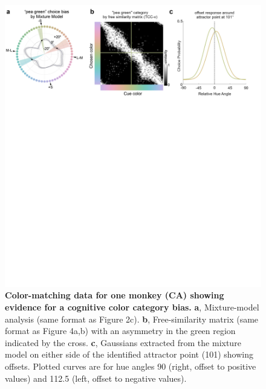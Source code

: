 \documentclass[9pt,biorxiv,lineno,onehalfspacing]{lapreprint}
\begin{document}
\begin{refsection}
\begin{figure}
    \begin{fullwidth}
    \centering
    \includegraphics[width=\textwidth+4cm,trim={0 18cm 0 0},clip]{Outputs/Paper/Figures/flat/F5_CastorCogBias_8.png}
    \caption{\textbf {Color-matching data for one monkey (CA) showing evidence for a cognitive color category bias.} 
    \textbf{a}, Mixture-model analysis (same format as Figure 2c). 
	\textbf{b}, Free-similarity matrix (same format as Figure 4a,b) with an asymmetry in the green region indicated by the cross.
    \textbf{c}, Gaussians extracted from the mixture model on either side of the identified attractor point (101\degree{}) showing offsets. 
    Plotted curves are for hue angles 90\degree{} (right, offset to positive values) and 112.5\degree{} (left, offset to negative values).}
    \label{fig:IndiDataCogBias}
    \end{fullwidth}
\end{figure}


\end{refsection}
\end{document}
